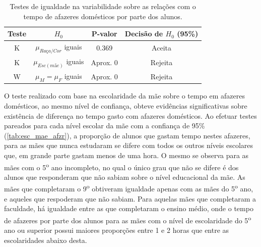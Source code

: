 \begin{table}[htb]
    \caption{Testes de igualdade na variabilidade sobre as relações 
            com o tempo de afazeres domésticos por parte dos alunos.}
            \label{tab:af_test}
        \centering
        \begin{tabular}{cccc}
        \toprule
        Teste & $H_0$& P-valor & Decisão de $H_0$ (95\%)\\
        \midrule \midrule
        K & $\mu_{Raça/Cor}$ iguais & 0.369 & Aceita\\
        K & $\mu_{Esc(mãe)}$ iguais & Aprox. 0 & Rejeita\\
        W & $\mu_M = \mu_F$ iguais & Aprox. 0 & Rejeita\\
        \bottomrule
        \end{tabular}
\end{table}

O teste realizado com base na escolaridade da mãe sobre o tempo em afazeres domésticos,
ao mesmo nível de confiança, obteve evidências significativas sobre existência de diferença
no tempo gasto com afazeres domésticos. Ao efetuar testes pareados para cada nível escolar da mãe com a confiança
de 95\% (\autoref{tab:esc_mae_afzr}), a proporção de alunos que gastam tempo nestes
afazeres, para as mães que nunca estudaram se difere com todos os outros níveis escolares que,
em grande parte gastam menos de uma hora. O mesmo se observa para as mães com o
5\textsuperscript{o} ano incompleto, no qual o único grau que não se difere é dos alunos que
responderam que não sabiam sobre o nível educacional da mãe. As mães que completaram o 9\textsuperscript{o}
obtiveram igualdade apenas com as mães do 5\textsuperscript{o} ano, e aqueles que respoderam que não
sabiam. Para aquelas mães que completaram a faculdade, há igualdade entre as que completaram o
ensino médio, onde o tempo de afazeres por parte dos alunos para as mães com o nível de 
escolaridade do 5\textsuperscript{o} ano ou superior possui maiores proporções entre 1 e 2 horas
que entre as escolaridades abaixo desta.

